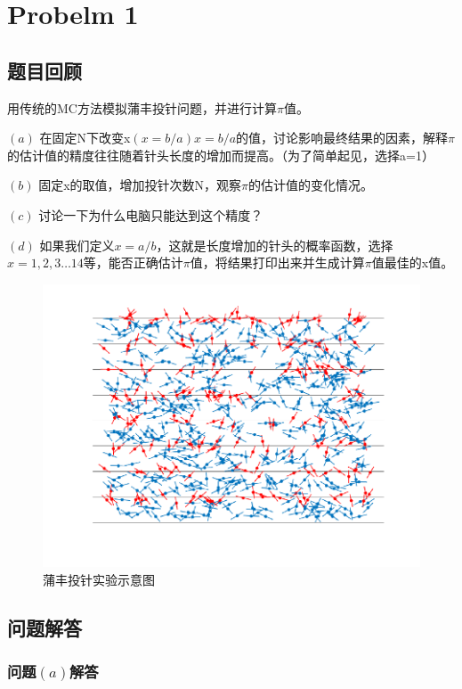 \documentclass[12pt,a4paper]{article}%
\begin{document}
\section{Probelm 1}
\subsection{题目回顾}
用传统的MC方法模拟蒲丰投针问题，并进行计算$\pi$值。

$\left(a\right)$ 在固定N下改变x$\left(x=b/a\right) x=b/a $的值，讨论影响最终结果的因素，解释$\pi$的估计值的精度往往随着针头长度的增加而提高。（为了简单起见，选择a=1）

$\left(b\right)$ 固定x的取值，增加投针次数N，观察$\pi$的估计值的变化情况。

$\left(c\right)$ 讨论一下为什么电脑只能达到这个精度？

$\left(d\right)$ 如果我们定义$x=a/b$，这就是长度增加的针头的概率函数，选择$x=1,2,3\dots14$等，能否正确估计$\pi$值，将结果打印出来并生成计算$\pi$值最佳的x值。

\begin{figure}[htbp]
    \centering
    \includegraphics[height=0.4 \textheight]{蒲丰投针示意图.pdf}
    \caption{蒲丰投针实验示意图}\label{投针示意图}
\end{figure}

\subsection{问题解答}
\subsubsection{问题$\left(a\right)$解答}
\end{document}
